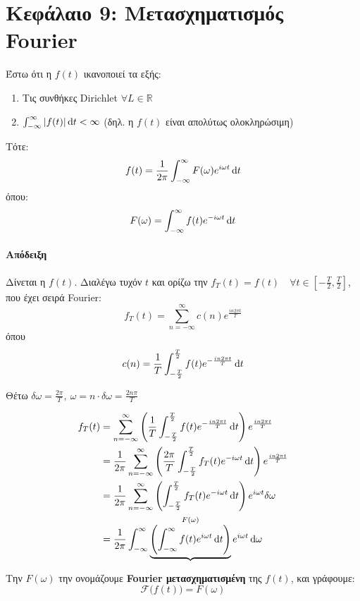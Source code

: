 \documentclass[11pt,a4paper,titlepage,final]{article}
\begin{document}
\section{Κεφάλαιο 9: Μετασχηματισμός Fourier}
\begin{theorem*}{}
Έστω ότι η \(f(t)\) ικανοποιεί τα εξής:
\begin{enumerate}
\item Τις συνθήκες \textlatin{Dirichlet} \(\forall L \in  \mathbb R \)
\item \( \int_{-\infty}^\infty |f(t)| \dif t < \infty\) (δηλ. η \(f(t)\) είναι απολύτως ολοκληρώσιμη)
\end{enumerate}

Τότε:
\[
f(t) = \frac{1}{2\pi}
\int_{-\infty}^\infty F(\omega) e^{i\omega t} \dif t
\]
όπου:
\[
F(\omega) = \int_{-\infty}^\infty f(t)e^{-i\omega t} \dif t
\]

\end{theorem*}

\paragraph{Απόδειξη}
Δίνεται η \(f(t)\). Διαλέγω τυχόν \(t\) και ορίζω την \(f_T(t) = f(t)\quad \forall t \in \left[ -\frac{T}{2}, \frac{T}{2} \right]\), που έχει σειρά \textlatin{Fourier}:
\[
f_T(t) = \sum_{n=-\infty}^\infty c(n) e^\frac{in2\pi t}{T}
\]
όπου
\[
c(n) = \frac{1}{T} \int_{-\frac{T}{2}}^\frac{T}{2} f(t) e^{-\frac{in2\pi t}{T}} \dif t
\]

Θέτω \(\delta \omega = \frac{2\pi}{T},\ \omega = n\cdot \delta \omega = \frac{2n\pi}{T}
\)

\begin{align*}
f_T(t) &= \sum_{n=-\infty}^\infty
\left(
\frac{1}{T} \int_{-\frac{T}{2}}^\frac{T}{2} f(t) e^{-\frac{in2\pi t}{T}} \dif t
\right) e^\frac{in2\pi t}{T}
\\ &= \frac{1}{2\pi}
\sum_{n=-\infty}^\infty
\left(
\frac{2\pi}{T}
\int_{-\frac{T}{2}}^\frac{T}{2}
f_T(t)e^{-i\omega t} \dif t
\right) e^\frac{in2\pi t}{T}
\\ &=
\frac{1}{2\pi}
\sum_{n=-\infty}^\infty
\left(
\int_{-\frac{T}{2}}^\frac{T}{2}
f_T(t)e^{-i\omega t} \dif t
\right)
e^{i\omega t} \delta \omega
\\ &=
\frac{1}{2\pi}
\int_{-\infty}^\infty
\underbrace{\left(
\int_{-\infty}^\infty
f(t)e^{i\omega t} \dif t
\right)}^{F(\omega)}
e^{i\omega t}
\dif \omega
\end{align*}

Την \(F(\omega)\) την ονομάζουμε \textbf{\textlatin{Fourier} μετασχηματισμένη} της \(f(t)\), και γράφουμε:
\[
\mathscr{F}\bigg( f(t) \bigg) = F(\omega)
\]
\end{document}
